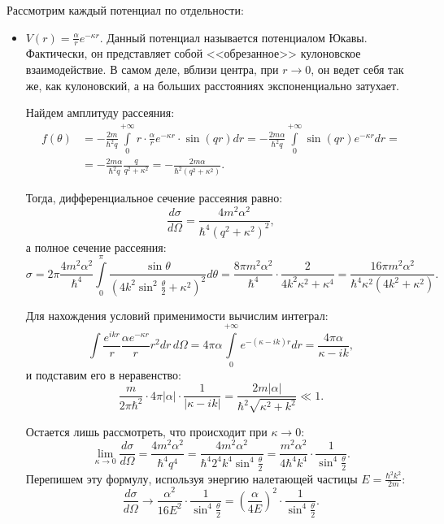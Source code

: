 Рассмотрим каждый потенциал по отдельности:
\begin{itemize}
  \item $V(r) = \frac{\alpha}{r}e^{-\kappa r}$. Данный потенциал называется потенциалом
        Юкавы. Фактически, он представляет собой <<обрезанное>> кулоновское
        взаимодействие. В самом деле, вблизи центра, при $r\to0$, он ведет себя так же,
        как кулоновский, а на больших расстояниях экспоненциально затухает.

        Найдем амплитуду рассеяния:
        \begin{align*}
          f(\theta) &= -\frac{2m}{\hbar^2q}\int\limits_0^{+\infty}
          r\cdot \frac{\alpha}{r}e^{-\kappa r}\cdot\sin(qr)dr =
          -\frac{2m\alpha}{\hbar^2q}\int\limits_{0}^{+\infty}\sin(qr) e^{-\kappa r}dr = \\
          &= -\frac{2m\alpha}{\hbar^2 q}\frac{q}{q^2+\kappa^2} =
          -\frac{2m\alpha}{\hbar^2(q^2+\kappa^2)}.
        \end{align*}

        Тогда, дифференциальное сечение рассеяния равно:
        \[
          \frac{d\sigma}{d\Omega} = \frac{4m^2\alpha^2}{\hbar^4(q^2+\kappa^2)^2},
        \]
        а полное сечение рассеяния:
        \[
          \sigma = 2\pi\frac{4m^2\alpha^2}{\hbar^4}\int\limits_0^{\pi}
          \frac{\sin\theta}{(4k^2\sin^2\frac{\theta}{2}+\kappa^2)^2}d\theta =
          \frac{8\pi m^2\alpha^2}{\hbar^4}\cdot\frac{2}{4k^2\kappa^2+\kappa^4} =
          \frac{16\pi m^2\alpha^2}{\hbar^4\kappa^2(4k^2+\kappa^2)}.
        \]

        Для нахождения условий применимости вычислим интеграл:
        \[
          \int\frac{e^{ikr}}{r}\frac{\alpha e^{-\kappa r}}{r} r^2dr\,d\Omega =
          4\pi\alpha\int\limits_0^{+\infty}e^{-(\kappa-ik)r}dr = \frac{4\pi\alpha}{\kappa-ik},
        \]
        и подставим его в неравенство:
        \[
          \frac{m}{2\pi\hbar^2}\cdot4\pi|\alpha|\cdot\frac{1}{|\kappa-ik|} =
          \frac{2m|\alpha|}{\hbar^2\sqrt{\kappa^2+k^2}}\ll1.
        \]

        Остается лишь рассмотреть, что происходит при $\kappa\to0$:
        \[
          \lim\limits_{\kappa\to0}\frac{d\sigma}{d\Omega} =
          \frac{4m^2\alpha^2}{\hbar^4q^4} =
          \frac{4m^2\alpha^2}{\hbar^4 2^4 k^4\sin^4\frac{\theta}{2}} =
          \frac{m^2\alpha^2}{4\hbar^4k^4}\cdot\frac{1}{\sin^4\frac{\theta}{2}}.
        \]
        Перепишем эту формулу, используя энергию налетающей частицы $E = \frac{\hbar^2
            k^2}{2m}$:
        \[
          \frac{d\sigma}{d\Omega}\to \frac{\alpha^2}{16E^2}\cdot\frac{1}{\sin^4\frac{\theta}{2}} =
          \left(\frac{\alpha}{4E}\right)^2\cdot\frac{1}{\sin^4\frac{\theta}{2}}.
        \]


\end{itemize}
